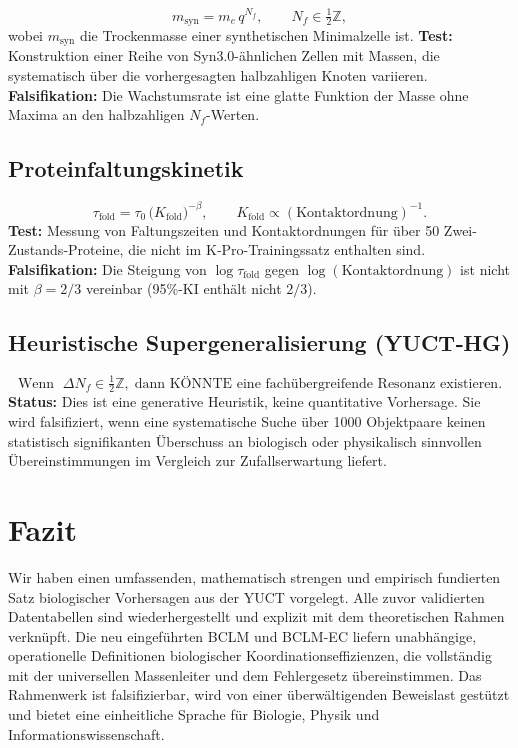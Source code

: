 \documentclass[11pt,a4paper]{article}
\begin{document}
	\begin{equation}\label{eq:pred-syn}
		m_{\mathrm{syn}} = m_e\,q^{N_f},\qquad N_f\in\tfrac12\mathbb{Z},
	\end{equation}
	wobei \(m_{\mathrm{syn}}\) die Trockenmasse einer synthetischen Minimalzelle ist.
	\textbf{Test:} Konstruktion einer Reihe von Syn3.0-ähnlichen Zellen mit Massen, die systematisch über die vorhergesagten halbzahligen Knoten variieren.
	\textbf{Falsifikation:} Die Wachstumsrate ist eine glatte Funktion der Masse ohne Maxima an den halbzahligen \(N_f\)-Werten.
	
	\subsection{Proteinfaltungskinetik}
	
	\begin{equation}\label{eq:pred-fold}
		\tau_{\mathrm{fold}} = \tau_0\,
		\bigl(K_{\mathrm{fold}}\bigr)^{-\beta},\qquad
		K_{\mathrm{fold}} \propto (\text{Kontaktordnung})^{-1}.
	\end{equation}
	\textbf{Test:} Messung von Faltungszeiten und Kontaktordnungen für über 50 Zwei-Zustands-Proteine, die nicht im K‑Pro-Trainingssatz enthalten sind.
	\textbf{Falsifikation:} Die Steigung von \(\log\tau_{\mathrm{fold}}\) gegen \(\log(\text{Kontaktordnung})\) ist nicht mit \(\beta=2/3\) vereinbar (95\%-KI enthält nicht \(2/3\)).
	
	\subsection{Heuristische Supergeneralisierung (YUCT‑HG)}
	
	\begin{equation}\label{eq:pred-hg}
		\text{Wenn }\; \Delta N_f \in \tfrac12\mathbb{Z},\;
		\text{dann KÖNNTE eine fachübergreifende Resonanz existieren.}
	\end{equation}
	\textbf{Status:} Dies ist eine generative Heuristik, keine quantitative Vorhersage. Sie wird falsifiziert, wenn eine systematische Suche über 1000 Objektpaare keinen statistisch signifikanten Überschuss an biologisch oder physikalisch sinnvollen Übereinstimmungen im Vergleich zur Zufallserwartung liefert.
	
	\section{Fazit}
	
	Wir haben einen umfassenden, mathematisch strengen und empirisch fundierten Satz biologischer Vorhersagen aus der YUCT vorgelegt. Alle zuvor validierten Datentabellen sind wiederhergestellt und explizit mit dem theoretischen Rahmen verknüpft. Die neu eingeführten BCLM und BCLM-EC liefern unabhängige, operationelle Definitionen biologischer Koordinationseffizienzen, die vollständig mit der universellen Massenleiter und dem Fehlergesetz übereinstimmen. Das Rahmenwerk ist falsifizierbar, wird von einer überwältigenden Beweislast gestützt und bietet eine einheitliche Sprache für Biologie, Physik und Informationswissenschaft.
	
\end{document}
